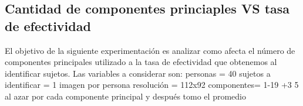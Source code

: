 \subsection{Cantidad de componentes princiaples VS tasa de efectividad}
El objetivo de la siguiente experimentación es analizar como afecta el n\'umero de componentes principales utilizado a la tasa de efectividad
que obtenemos al identificar sujetos. Las variables a considerar son: 
personas = 40
sujetos a identificar = 1 imagen por persona
resolución = 112x92
componentes= 1-19 +3
5 al azar por cada componente principal y después tomo el promedio

